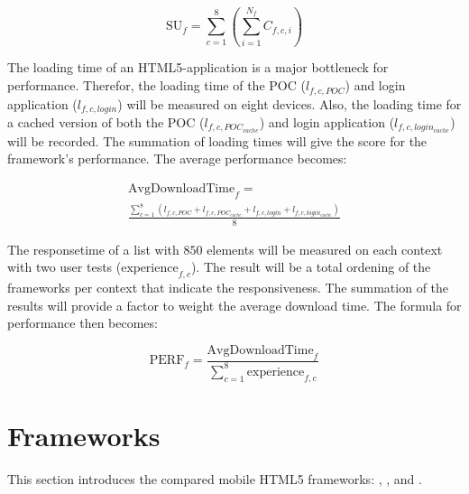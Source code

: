 \documentclass[a4paper]{artikel3}
\newcommand{\setspace}[0]{\vspace{2mm}}
\renewcommand{\paragraph}[1]{\setspace \noindent {\bf #1}  }
\begin{document}
\begin{equation}
  \text{SU}_f = \sum_{c=1}^{8}{\left(\sum_{i=1}^{N_f}C_{f,c,i}\right)}
  \label{eq:ondersteuning}
\end{equation}

\paragraph{Performance}
The loading time of an HTML5-application is a major bottleneck for performance.
Therefor,  the loading time of the POC ($l_{f,c,POC}$) and login application ($l_{f,c,login}$) will be measured on eight devices.
Also,  the loading time for a cached version of both the POC ($l_{f,c,POC_{cache}}$) and login application ($l_{f,c,login_{cache}}$) will be recorded.
The summation of loading times will give the score for the framework's performance.
The average performance becomes:


\begin{equation}
\begin{split}
\text{AvgDownloadTime}_f =  \\ \frac{\sum_{c=1}^{8}\left(l_{f,c,POC}+l_{f,c,POC_{cache}}+ l_{f,c,login} + l_{f,c,login_{cache}}\right)}{8}
  \label{eq:dowloadtime}
\end{split}
\end{equation}

The responsetime of a list with $850$ elements will be measured on each context with two user tests ($\text{experience}_{f,c}$).
The result will be a total ordening of the frameworks per context that indicate the responsiveness.
The summation of the results will provide a factor to weight the average download time.
The formula for performance then becomes:

\begin{equation}
  \text{PERF}_f =  \frac{\text{AvgDownloadTime}_f}{\sum_{c=1}^{8}{\text{experience}_{f,c}}}
  \label{eq:performance}
\end{equation}


\section{Frameworks} %
\label{sec:frameworks}
This section introduces the compared mobile HTML5 frameworks: \st{}, \kendo{}, \jqm{} and \lungo{}.
\end{document}
